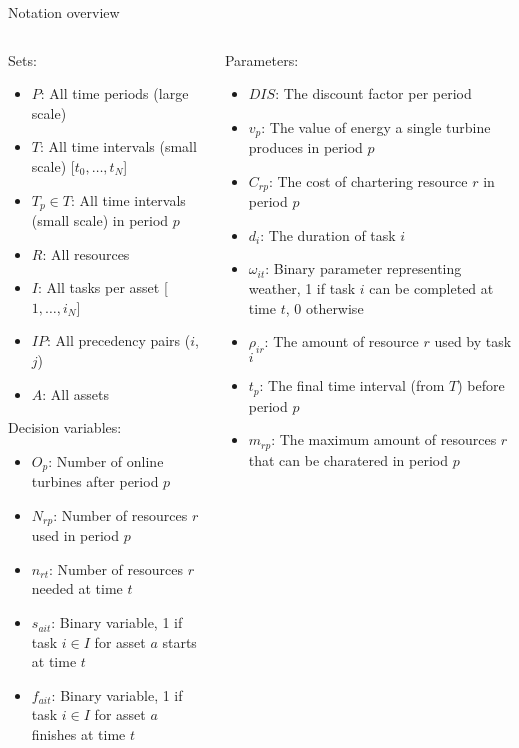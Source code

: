 \documentclass{beamer}
\begin{document}
\begin{frame}{Notation overview}
\scriptsize

\begin{columns}
\begin{column}{.48\textwidth}
Sets:
\begin{itemize}
\item $P$: All time periods (large scale)
\item $T$: All time intervals (small scale) [$t_0, \dots , t_N$]
\item $T_p \in T$: All time intervals (small scale) in period $p$
\item $R$: All resources
\item $I$:  All tasks per asset [$1, \dots , i_N$]
\item $IP$: All precedency pairs ($i$, $j$)
\item $A$: All assets
\end{itemize}

Decision variables:
\begin{itemize}
\item $O_{p}$: Number of online turbines after period $p$
\item $N_{rp}$: Number of resources $r$ used in period $p$
\item $n_{rt}$: Number of resources $r$ needed at time $t$
\item $s_{ait}$: Binary variable, 1 if task $i \in I$ for asset $a$ starts at time $t$
\item $f_{ait}$: Binary variable, 1 if task $i \in I$ for asset $a$ finishes at time $t$
\end{itemize}
\end{column}

\hfill

\begin{column}{.48\textwidth}
Parameters:
\begin{itemize}
\item $DIS$: The discount factor per period
\item $v_p$: The value of energy a single turbine produces in period $p$
\item $C_{rp}$: The cost of chartering resource $r$ in period $p$
\item $d_i$: The duration of task $i$
\item $\omega_{it}$: Binary parameter representing weather, 1 if task $i$ can be completed at time $t$, 0 otherwise
\item $\rho_{ir}$: The amount of resource $r$ used by task $i$
\item $t_p$: The final time interval (from $T$) before period $p$
\item $m_{rp}$: The maximum amount of resources $r$ that can be charatered in period $p$
\end{itemize}
\end{column}
\end{columns}

\end{frame}
\end{document}
